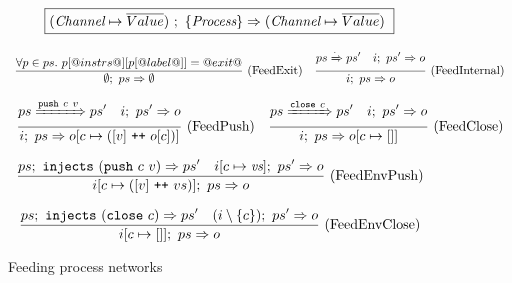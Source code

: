 
\begin{figure}

\newcommand\vs {\ti{vs}}
\newcommand\ps {\ti{ps}}

$$
  \boxed{
    (\textit{Channel} \mapsto \overline{Value})~;~\{ \textit{Process} \} \Rightarrow (\textit{Channel} \mapsto \overline{Value})~
  }
$$

$$
\enskip \frac {\displaystyle 
  \forall p \in ps.~
  p[@instrs@][p[@label@]] = @exit@
} {\displaystyle 
  \emptyset;~ps \Rightarrow \emptyset
} \  \mbox{(FeedExit)} \enskip
\enskip \frac {\displaystyle 
  ps \xRightarrow{\cdot} ps'
\quad
  i;~ps' \Rightarrow o
} {\displaystyle 
  i;~ps \Rightarrow o
} \  \mbox{(FeedInternal)} \enskip
$$

$$
\enskip \frac {\displaystyle 
  ps \xRightarrow{\texttt{push}~c~v} ps'
\quad
  i;~ps' \Rightarrow o
} {\displaystyle 
  i;~ps \Rightarrow o[c \mapsto ([v] ~\texttt{++}~ o[c])]
} \  \mbox{(FeedPush)} \enskip
\enskip \frac {\displaystyle 
  ps \xRightarrow{\texttt{close}~c} ps'
\quad
  i;~ps' \Rightarrow o
} {\displaystyle 
  i;~ps \Rightarrow o[c \mapsto []]
} \  \mbox{(FeedClose)} \enskip
$$





$$
\ruleIN{
  \ProcsInject
    {ps}
    {(\Push~c~v)}
    {ps'}
\quad
  \ProcsFeed
    {i[c \mapsto \vs]}
    {ps'}
    {o}
}{
  \ProcsFeed
    {i[c \mapsto ([v] \listappend vs)]}
    {ps}
    {o}
}{FeedEnvPush}
$$

$$
\enskip \frac {\displaystyle 
  ps;~\texttt{injects}~(\texttt{close}~c) \Rightarrow ps'
\quad
  (i\setminus\{ c \});~ps' \Rightarrow o
} {\displaystyle 
  i[c \mapsto [] ];~ps \Rightarrow o
} \  \mbox{(FeedEnvClose)} \enskip
$$



\caption{Feeding process networks}
\label{fig:Process:Eval:Feed}
\end{figure}

